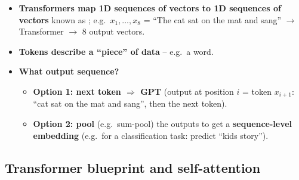 \begin{itemize}
  \item \textbf{Transformers map 1D sequences of vectors to 1D sequences of
    vectors} known as ; e.g.\ $x_1,\dots,x_8$ = ``The cat sat on
    the mat and sang'' $\to$ Transformer $\to$ 8 output vectors.
  \item \textbf{Tokens describe a ``piece'' of data} -- e.g.\ a word.
  \item \textbf{What output sequence?}
    \begin{itemize}
      \item \textbf{Option 1: next token $\Rightarrow$ GPT} (output at position
        $i$ = token $x_{i+1}$: ``cat sat on the mat and sang'', then the next
        token).
      \item \textbf{Option 2: pool} (e.g.\ sum-pool) the outputs to get a
        \textbf{sequence-level embedding} (e.g.\ for a classification task:
        predict ``kids story'').
    \end{itemize}
\end{itemize}

\subsection{Transformer blueprint and self-attention}\label{sec:lec08-selfattn}

